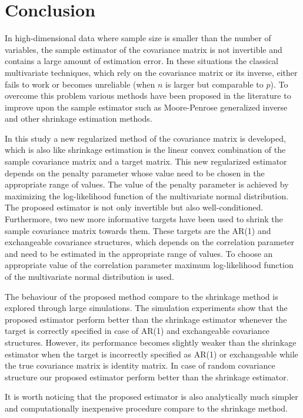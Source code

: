 \chapter{Conclusion}


In high-dimensional data where sample size is smaller than the number of variables, the sample estimator of the covariance matrix is not invertible and contains a large amount of estimation error. In these situations the classical multivariate techniques, which rely on the covariance matrix or its inverse, either fails to work or becomes unreliable (when $n$ is larger but comparable to $p$). To overcome this problem various methods have been proposed in the literature to improve upon the sample estimator such as Moore-Penrose generalized inverse and other shrinkage estimation methods. 

In this study a new regularized method of the covariance matrix is developed, which is also like shrinkage estimation is the linear convex combination of the sample covariance matrix and a target matrix. This new regularized estimator depends on the penalty parameter whose value need to be chosen in the appropriate range of values. The value of the penalty parameter is achieved by maximizing the log-likelihood function of the multivariate normal distribution. The proposed estimator is not only invertible but also well-conditioned. Furthermore, two new more informative targets have been used to shrink the sample covariance matrix towards them. These targets are the AR(1) and exchangeable covariance structures, which depends on the correlation parameter and need to be estimated in the appropriate range of values. To choose an appropriate value of the correlation parameter maximum log-likelihood function of the multivariate normal distribution is used. 

The behaviour of the proposed method compare to the shrinkage method is explored through large simulations. The simulation experiments show that the proposed estimator perform better than the shrinkage estimator whenever the target is correctly specified in case of AR(1) and exchangeable covariance structures. However, its performance becomes slightly weaker than the shrinkage estimator when the target is incorrectly specified as AR(1) or exchangeable while the true covariance matrix is identity matrix. In case of random covariance structure our proposed estimator perform better than the shrinkage estimator.

It is worth noticing that the proposed estimator is also analytically much simpler and computationally inexpensive procedure compare to the shrinkage method.
